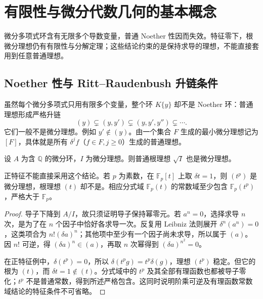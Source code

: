 
\section{有限性与微分代数几何的基本概念}
\label{b3:sec:E02}

微分多项式环含有无限多个导数变量，普通 Noether 性因而失效。特征零下，根微分理想仍有有限性与分解定理；这些结论约束的是保持求导的理想，不能直接套用到任意普通理想。


\subsection{Noether 性与 Ritt–Raudenbush 升链条件}
\label{b3:subsec:E02:01}

虽然每个微分多项式只用有限多个变量，整个环 \(K\{y\}\) 却不是 Noether 环：普通理想形成严格升链
\[
	(y)\subsetneq(y,y')\subsetneq(y,y',y'')\subsetneq\cdots.
\]
它们一般不是微分理想。例如 \(y'\notin(y)\)。由一个集合 \(F\) 生成的最小微分理想记为 \([F]\)，具体就是所有 \(\delta^jf\)（\(f\in F,j\ge0\)）生成的普通理想。

\begin{lemma}\label{b3:lem:differential-radical}\label{b3:lem:E-characteristic-p-warning}
	设 \(A\) 为含 \(\mathbb Q\) 的微分环，\(I\) 为微分理想。则普通根理想 \(\sqrt I\) 也是微分理想。

	正特征不能直接采用这个结论。若 \(p\) 为素数，在 \(\mathbb F_p[t]\) 上取 \(\delta t=1\)，则 \((t^p)\) 是微分理想，根理想 \((t)\) 却不是。相应分式域 \(\mathbb F_p(t)\) 的常数域至少包含 \(\mathbb F_p(t^p)\)，严格大于 \(\mathbb F_p\)。
\end{lemma}
\begin{proof}
	导子下降到 \(A/I\)，故只须证明导子保持幂零元。若 \(a^n=0\)，选择求导 \(n\) 次，是为了在 \(n\) 个因子中恰好各求导一次。反复用 Leibniz 法则展开 \(\delta^n(a^n)=0\)，这类项合为 \(n!(\delta a)^n\)；其他项中至少有一个因子尚未求导，所以属于 \((a)\)。因 \(n!\) 可逆，得 \((\delta a)^n\in(a)\)，再取 \(n\) 次幂得到 \((\delta a)^{n^2}=0\)。

	在正特征例中，\(\delta(t^p)=0\)，所以 \(\delta(t^pg)=t^p\delta(g)\)，理想 \((t^p)\) 稳定。但它的根为 \((t)\)，而 \(\delta t=1\notin(t)\)。分式域中的 \(t^p\) 及其全部有理函数也都被导子零化；\(t^p\) 不是普通常数，得到所述严格包含。这同时说明阶乘可逆及有理函数常数域结论的特征条件不可省略。
\end{proof}

